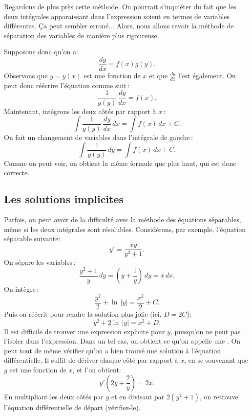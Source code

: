 Regardons de plus près cette méthode.  On pourrait s'inquiéter du fait que les deux intégrales apparaissant dans l'expression soient en termes de variables différentes.  Ça peut sembler erroné... Alors, nous allons revoir la méthode de séparation des variables de manière plus rigoureuse.

Supposons donc qu'on a: 
\begin{equation*}
\frac{dy}{dx} = f(x)g(y) .
\end{equation*}
Observons que $y = y(x)$ est une fonction de $x$ et que
$\frac{dy}{dx}$ l'est également.  On peut donc réécrire l'équation comme suit\,: 
\begin{equation*}
\frac{1}{g(y)}\,\frac{dy}{dx} = f(x) .
\end{equation*}
Maintenant, intégrons les deux côtés par rapport à $x$\,: 
\begin{equation*}
\int \frac{1}{g(y)}\,\frac{dy}{dx} \,dx = \int f(x) \,dx + C .
\end{equation*}
On fait un changement de variables dans l'intégrale de gauche\,: 
\begin{equation*}
\int \frac{1}{g(y)}\,dy = \int f(x) \,dx + C .
\end{equation*}
Comme on peut voir, on obtient la même formule que plus haut, qui est donc correcte.

\subsection{Les solutions implicites}

Parfois, on peut avoir de la difficulté avec la méthode des équations séparables, même si les deux intégrales sont résolubles.  Considérons, par exemple, l'équation séparable suivante: 
\begin{equation*}
y' = \frac{xy}{y^2+1} .
\end{equation*}
On sépare les variables\,: 
\begin{equation*}
\frac{y^2+1}{y}\,dy = \left(y+\frac{1}{y}\right)\,dy = x\,dx .
\end{equation*}
On intègre\,: 
\begin{equation*}
\frac{y^2}{2} + \ln \, \lvert y \rvert = \frac{x^2}{2} + C. 
\end{equation*}
Puis on réécrit pour rendre la solution plus jolie (ici, $D = 2C$): 
\begin{equation*}
y^2 + 2 \ln \, \lvert y\rvert = x^2 + D .
\end{equation*}
Il est difficile de trouver une expression explicite pour $y$, puisqu'on ne peut pas l'isoler dans l'expression.  Dans un tel cas, on obtient ce qu'on appelle une 
\emph{}.
On peut tout de même vérifier qu'on a bien trouvé une solution à l'équation différentielle.  Il suffit de dériver chaque côté par rapport à $x$, en se souvenant que $y$ est une fonction de $x$, et l'on obtient: 
\begin{equation*}
	y'\left(2y + \frac{2}{y}\right) = 2x .
\end{equation*}
En multipliant les deux côtés par $y$ et en divisant par $2(y^2+1)$, on retrouve l'équation différentielle de départ (vérifiez-le).

